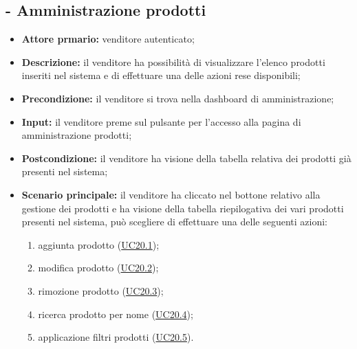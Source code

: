 \subsection{ - Amministrazione prodotti}
\begin{itemize}
    \item \textbf{Attore prmario:} venditore autenticato;
    \item \textbf{Descrizione:} il venditore ha possibilità di visualizzare l’elenco prodotti inseriti nel sistema e di effettuare una delle azioni rese disponibili;
    \item \textbf{Precondizione:} il venditore si trova nella dashboard di amministrazione;
    \item \textbf{Input:} il venditore preme sul pulsante per l'accesso alla pagina di amministrazione prodotti;
    \item \textbf{Postcondizione:} il venditore ha visione della tabella relativa dei prodotti già presenti nel sistema;
    \item \textbf{Scenario principale:} il venditore ha cliccato nel bottone relativo alla gestione dei prodotti e ha visione della tabella riepilogativa dei vari prodotti presenti nel sistema, può scegliere di effettuare una delle seguenti azioni:
          \begin{enumerate}
              \item aggiunta prodotto (\hyperref[UC20.1]{UC20.1});
              \item modifica prodotto (\hyperref[UC20.2]{UC20.2});
              \item rimozione prodotto (\hyperref[UC20.3]{UC20.3});
              \item ricerca prodotto per nome (\hyperref[UC20.4]{UC20.4});
              \item applicazione filtri prodotti (\hyperref[UC20.5]{UC20.5}).
          \end{enumerate}
\end{itemize}

\stepsubUserCase
